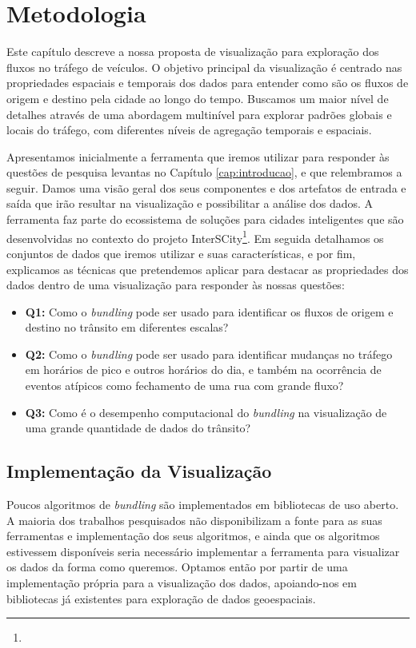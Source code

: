 \chapter{Metodologia}
\label{cap:metodologia}
 Este capítulo descreve a nossa proposta de visualização para exploração dos
fluxos no tráfego de veículos. O objetivo principal da visualização é centrado
nas propriedades espaciais e temporais dos dados para entender como são os
fluxos de origem e destino pela cidade ao longo do tempo. Buscamos um maior
nível de detalhes através de uma abordagem multinível para explorar padrões
globais e locais do tráfego, com diferentes níveis de agregação temporais e
espaciais.

 Apresentamos inicialmente a ferramenta que iremos utilizar para responder às
questões de pesquisa levantas no Capítulo \ref{cap:introducao}, e que
relembramos a seguir. Damos uma visão geral dos seus componentes e dos
artefatos de entrada e saída que irão resultar na visualização e possibilitar a
análise dos dados. A ferramenta faz parte do ecossistema de soluções para
cidades inteligentes que são desenvolvidas no contexto do projeto
InterSCity\footnote{}. Em seguida detalhamos os conjuntos
de dados que iremos utilizar e suas características, e por fim, explicamos as
técnicas que pretendemos aplicar para destacar as propriedades dos dados dentro
de uma visualização para responder às nossas questões:

\begin{itemize}
  \item \textbf{Q1:} Como o \emph{bundling} pode ser usado para identificar os
fluxos de origem e destino no trânsito em diferentes escalas?

  \item \textbf{Q2:} Como o \emph{bundling} pode ser usado para identificar
mudanças no tráfego em horários de pico e outros horários do dia, e também na
ocorrência de eventos atípicos como fechamento de uma rua com grande fluxo?

  \item \textbf{Q3:} Como é o desempenho computacional do \emph{bundling} na
visualização de uma grande quantidade de dados do trânsito?
\end{itemize}

\section{Implementação da Visualização}
  Poucos algoritmos de \emph{bundling} são implementados em bibliotecas de uso
aberto. A maioria dos trabalhos pesquisados não disponibilizam a fonte para as
suas ferramentas e implementação dos seus algoritmos, e ainda que os algoritmos
estivessem disponíveis seria necessário implementar a ferramenta para
visualizar os dados da forma como queremos. Optamos então por partir de uma
implementação própria para a visualização dos dados, apoiando-nos em
bibliotecas já existentes para exploração de dados geoespaciais.

